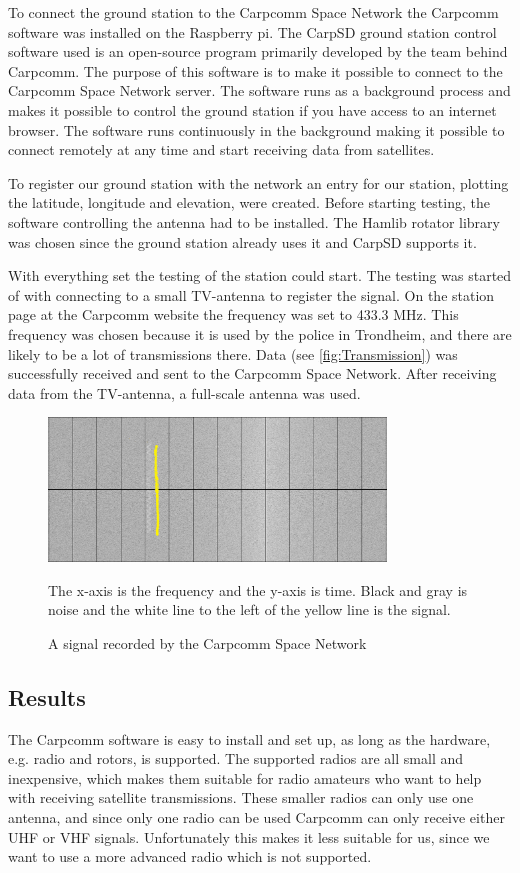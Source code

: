 To connect the ground station to the Carpcomm Space Network the Carpcomm software was installed on the Raspberry pi. The CarpSD ground station control software used is an open-source program primarily developed by the team behind Carpcomm. The purpose of this software is to make it possible to connect to the Carpcomm Space Network server. The software runs as a background process and makes it possible to control the ground station if you have access to an internet browser. The software runs continuously in the background making it possible to connect remotely at any time and start receiving data from satellites.

To register our ground station with the network an entry for our station, plotting the latitude, longitude and elevation, were created. 
Before starting testing, the software controlling the antenna had to be installed. The Hamlib rotator library was chosen since the ground station already uses it and CarpSD supports it. 

With everything set the testing of the station could start. The testing was started of with connecting to a small TV-antenna to register the signal. On the station page at the Carpcomm website the frequency was set to 433.3 MHz. This frequency was chosen because it is used by the police in Trondheim, and there are likely to be a lot of transmissions there. Data (see \autoref{fig:Transmission}) was successfully received and sent to the Carpcomm Space Network. After receiving data from the TV-antenna, a full-scale antenna was used.

\begin{figure}
	\centering
	\includegraphics[width=0.8\textwidth]{Figures/sattelite_transmition}
	\label{fig:Transmission}
	\caption{A signal recorded by the Carpcomm Space Network}
The x-axis is the frequency and the y-axis is time. Black and gray is noise and the white line to the left of the yellow line is the signal.
\end{figure}

\subsection{Results}
The Carpcomm software is easy to install and set up, as long as the hardware, e.g. radio and rotors, is supported. The supported radios are all small and inexpensive, which makes them suitable for radio amateurs who want to help with receiving satellite transmissions. These smaller radios can only use one antenna, and since only one radio can be used Carpcomm can only receive either UHF or VHF signals. Unfortunately this makes it less suitable for us, since we want to use a more advanced radio which is not supported.

